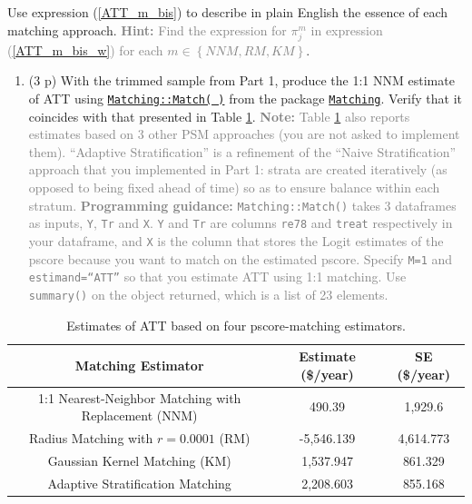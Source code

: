 \documentclass[
]{article}
\providecommand{\tightlist}{%
  \setlength{\itemsep}{0pt}\setlength{\parskip}{0pt}}
\begin{document}
\noindent Use expression (\ref{ATT_m_bis}) to describe in plain English
the essence of each matching approach.
\textcolor{gray}{\textbf{Hint:} Find the expression for $\pi _{j}^{m}$ in expression (\ref{ATT_m_bis_w}) for each $m\in \left\{NNM,RM,KM\right\} $}.

\begin{enumerate}
\def\labelenumi{\arabic{enumi}.}
\setcounter{enumi}{5}
\tightlist
\item
  (3 p) With the trimmed sample from Part 1, produce the 1:1 NNM
  estimate of ATT using
  \href{https://www.rdocumentation.org/packages/Matching/versions/4.9-6/topics/Match}{\texttt{Matching::Match( )}}
  from the package
  \href{https://cran.r-project.org/web/packages/Matching/Matching.pdf}{\texttt{Matching}}.
  Verify that it coincides with that presented in Table
  \ref{tab:Tab25-4_2}.
  \textcolor{gray}{\textbf{Note:} Table \ref{tab:Tab25-4_2} also reports estimates based on 3 other PSM approaches (you are not asked to implement them). ``Adaptive Stratification'' is a refinement of the ``Naive Stratification'' approach that you implemented in Part 1: strata are created iteratively (as opposed to being fixed ahead of time) so as to ensure balance within each stratum.}
  \textcolor{gray}{\textbf{Programming guidance:} \texttt{Matching::Match()} takes 3 dataframes as inputs, \texttt{Y}, \texttt{Tr} and \texttt{X}. \texttt{Y} and \texttt{Tr} are columns \texttt{re78} and \texttt{treat} respectively in your dataframe, and \texttt{X} is the column that stores the Logit estimates of the pscore because you want to match on the estimated pscore. Specify \texttt{M=1} and \texttt{estimand=``ATT''} so that you estimate ATT using 1:1 matching. Use \texttt{summary()} on the object returned, which is a list of 23 elements.}
  \label{item:estimate-att-ncs}
\end{enumerate}

\begin{table}[h]
\centering
\begin{tabular}{ccc}
\hline \hline
\textbf{Matching Estimator} & \textbf{Estimate (\$/year)} & \textbf{SE (\$/year)} \\ \hline
1:1 Nearest-Neighbor Matching with Replacement (NNM)       &  490.39 & 1,929.6  \\
Radius Matching with $r=0.0001$ (RM)  &  -5,546.139 &  4,614.773 \\
Gaussian Kernel Matching (KM)        &  1,537.947 & 861.329  \\ 
Adaptive Stratification Matching     &  2,208.603 &  855.168 \\ \hline
\end{tabular}
\caption{Estimates of ATT based on four pscore-matching estimators.}
\label{tab:Tab25-4_2}
\end{table}
\end{document}
